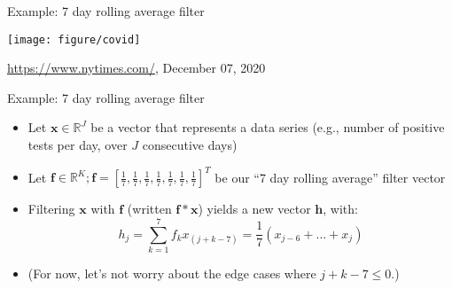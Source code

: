 
\begin{vbframe}{Example: 7 day rolling average filter}

\vfill

\begin{center}
\texttt{[image: figure/covid]}
\end{center}

{\hfill \footnotesize \url{https://www.nytimes.com/}, December 07, 2020}

\vfill

\end{vbframe}


\begin{vbframe}{Example: 7 day rolling average filter}

\vfill

\begin{itemize}
	\item Let $\mathbf{x} \in \mathbb{R}^{J}$ be a vector that represents a data series (e.g., number of positive tests per day, over $J$ consecutive days)
	\item Let $\mathbf{f} \in \mathbb{R}^{K}; \mathbf{f} = [\frac{1}{7}, \frac{1}{7}, \frac{1}{7}, \frac{1}{7}, \frac{1}{7}, \frac{1}{7}, \frac{1}{7}]^T$ be our ``7 day rolling average'' filter vector
	\item Filtering $\mathbf{x}$ with $\mathbf{f}$ (written $\mathbf{f} * \mathbf{x}$) yields a new vector $\mathbf{h}$, with:
	$$h_j = \sum_{k=1}^7 f_{k} x_{(j+k-7)} = \frac{1}{7} (x_{j-6} + \ldots + x_{j})$$
	\item (For now, let's not worry about the edge cases where $j+k-7 \leq 0$.)
\end{itemize}

\vfill

\end{vbframe}


